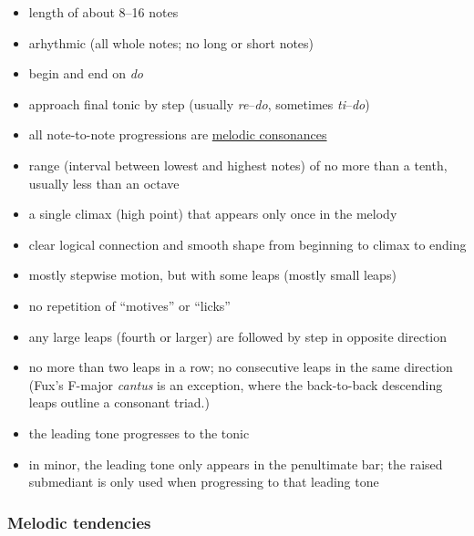 \documentclass{book}
\providecommand{\tightlist}{%
  \setlength{\itemsep}{0pt}\setlength{\parskip}{0pt}}
\begin{document}
\begin{itemize}
\tightlist
\item
  length of about 8--16 notes\\
\item
  arhythmic (all whole notes; no long or short notes)\\
\item
  begin and end on \emph{do}\\
\item
  approach final tonic by step (usually \emph{re}--\emph{do}, sometimes
  \emph{ti}--\emph{do})\\
\item
  all note-to-note progressions are \href{intervals.html}{melodic
  consonances}\\
\item
  range (interval between lowest and highest notes) of no more than a tenth,
  usually less than an octave\\
\item
  a single climax (high point) that appears only once in the melody\\
\item
  clear logical connection and smooth shape from beginning to climax to
  ending\\
\item
  mostly stepwise motion, but with some leaps (mostly small leaps)\\
\item
  no repetition of ``motives'' or ``licks''\\
\item
  any large leaps (fourth or larger) are followed by step in opposite
  direction\\
\item
  no more than two leaps in a row; no consecutive leaps in the same direction
  (Fux's F-major \emph{cantus} is an exception, where the back-to-back
  descending leaps outline a consonant triad.)\\
\item
  the leading tone progresses to the tonic\\
\item
  in minor, the leading tone only appears in the penultimate bar; the raised
  submediant is only used when progressing to that leading tone
\end{itemize}

\hypertarget{melodic-tendencies}{%
\subsubsection{Melodic tendencies}\label{melodic-tendencies}}
\end{document}
